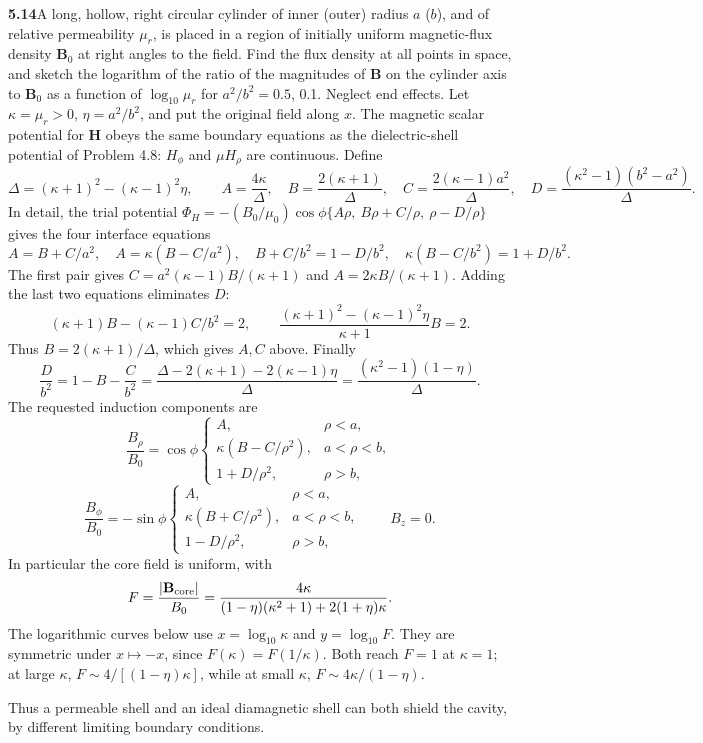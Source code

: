 \par\bigskip
\noindent\textbf{5.14}\quad A long, hollow, right circular cylinder of inner (outer) radius $a$ ($b$), and of relative permeability $\mu_{r}$, is placed in a region of initially uniform magnetic-flux density $\mathbf{B}_{0}$ at right angles to the field. Find the flux density at all points in space, and sketch the logarithm of the ratio of the magnitudes of $\mathbf{B}$ on the cylinder axis to $\mathbf{B}_{0}$ as a function of $\log_{10}\mu_{r}$ for $a^{2}/b^{2}=0.5$, 0.1. Neglect end effects.
\solution
Let $\kappa=\mu_r>0$, $\eta=a^2/b^2$, and put the original field along
$x$. The magnetic scalar potential for $\mathbf H$ obeys the same
boundary equations as the dielectric-shell potential of Problem 4.8:
$H_\phi$ and $\mu H_\rho$ are continuous. Define
\[
\Delta=(\kappa+1)^2-(\kappa-1)^2\eta,\qquad
A=\frac{4\kappa}{\Delta},\quad B=\frac{2(\kappa+1)}{\Delta},\quad
C=\frac{2(\kappa-1)a^2}{\Delta},\quad
D=\frac{(\kappa^2-1)(b^2-a^2)}{\Delta}.
\]
In detail, the trial potential
$\Phi_H=-(B_0/\mu_0)\cos\phi\{A\rho,\ B\rho+C/\rho,\ \rho-D/\rho\}$
gives the four interface equations
\[
A=B+C/a^2,\quad A=\kappa(B-C/a^2),\quad
B+C/b^2=1-D/b^2,\quad \kappa(B-C/b^2)=1+D/b^2.
\]
The first pair gives
$C=a^2(\kappa-1)B/(\kappa+1)$ and
$A=2\kappa B/(\kappa+1)$.
Adding the last two equations eliminates $D$:
\[
(\kappa+1)B-(\kappa-1)C/b^2=2,\qquad
\frac{(\kappa+1)^2-(\kappa-1)^2\eta}{\kappa+1}B=2.
\]
Thus $B=2(\kappa+1)/\Delta$, which gives $A,C$ above.
Finally
\[
\frac D{b^2}=1-B-\frac C{b^2}
=\frac{\Delta-2(\kappa+1)-2(\kappa-1)\eta}{\Delta}
=\frac{(\kappa^2-1)(1-\eta)}{\Delta}.
\]
The requested induction components are
\[
\boxed{\frac{B_\rho}{B_0}=\cos\phi
\begin{cases}A,&\rho<a,\\\kappa(B-C/\rho^2),&a<\rho<b,\\
1+D/\rho^2,&\rho>b,\end{cases}}
\]
\[
\boxed{\frac{B_\phi}{B_0}=-\sin\phi
\begin{cases}A,&\rho<a,\\\kappa(B+C/\rho^2),&a<\rho<b,\\
1-D/\rho^2,&\rho>b,\end{cases}\qquad B_z=0.}
\]
In particular the core field is uniform, with
\[
F=\frac{|\mathbf B_{\rm core}|}{B_0}
=\frac{4\kappa}{(1-\eta)(\kappa^2+1)+2(1+\eta)\kappa}.
\]
The logarithmic curves below use $x=\log_{10}\kappa$ and $y=\log_{10}F$.
They are symmetric under $x\mapsto-x$, since $F(\kappa)=F(1/\kappa)$.
Both reach $F=1$ at $\kappa=1$; at large $\kappa$,
$F\sim4/[(1-\eta)\kappa]$, while at small $\kappa$,
$F\sim4\kappa/(1-\eta)$.
\begin{center}

\end{center}
Thus a permeable shell and an ideal diamagnetic shell can both shield
the cavity, by different limiting boundary conditions.


